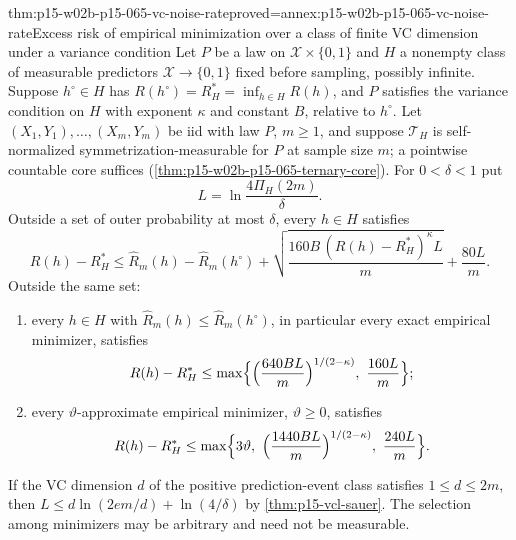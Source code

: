 \begin{hbtheorem}{thm:p15-w02b-p15-065-vc-noise-rate}{proved=annex:p15-w02b-p15-065-vc-noise-rate}{Excess risk of empirical minimization over a class of finite VC dimension under a variance condition}
Let \(P\) be a law on \(\mathcal X\times\{0,1\}\) and \(H\) a nonempty
class of measurable predictors \(\mathcal X\to\{0,1\}\) fixed before
sampling, possibly infinite. Suppose \(h^{\circ}\in H\) has
\(R(h^{\circ})=R_H^{*}=\inf_{h\in H}R(h)\), and \(P\) satisfies the variance
condition on \(H\) with exponent \(\kappa\) and constant \(B\), relative to
\(h^{\circ}\). Let \((X_1,Y_1),\ldots,(X_m,Y_m)\) be iid with law \(P\),
\(m\geq1\), and suppose \(\mathcal T_H\) is self-normalized
symmetrization-\allowbreak measurable for \(P\) at sample size \(m\); a
pointwise countable core suffices
(\cref{thm:p15-w02b-p15-065-ternary-core}). For \(0<\delta<1\) put
\[
 L=\ln\frac{4\Pi_H(2m)}{\delta}.
\]
Outside a set of outer probability at most \(\delta\), every \(h\in H\)
satisfies
\[
 R(h)-R_H^{*}\leq\widehat R_m(h)-\widehat R_m(h^{\circ})
 +\sqrt{\frac{160B\,(R(h)-R_H^{*})^{\kappa}L}{m}}+\frac{80L}{m}.
\]
Outside the same set:
\begin{enumerate}
\item every \(h\in H\) with \(\widehat R_m(h)\leq\widehat R_m(h^{\circ})\),
      in particular every exact empirical minimizer, satisfies
      \[
       R(h)-R_H^{*}\leq\max\Bigl\{\Bigl(\frac{640BL}{m}\Bigr)^{1/(2-\kappa)},\
       \frac{160L}{m}\Bigr\};
      \]
\item every \(\vartheta\)-approximate empirical minimizer,
      \(\vartheta\geq0\), satisfies
      \[
       R(h)-R_H^{*}\leq\max\Bigl\{3\vartheta,\
       \Bigl(\frac{1440BL}{m}\Bigr)^{1/(2-\kappa)},\ \frac{240L}{m}\Bigr\}.
      \]
\end{enumerate}
If the VC dimension \(d\) of the positive prediction-event class satisfies
\(1\leq d\leq2m\), then \(L\leq d\ln(2em/d)+\ln(4/\delta)\) by
\cref{thm:p15-vcl-sauer}. The selection among minimizers may be arbitrary
and need not be measurable.
\end{hbtheorem}

